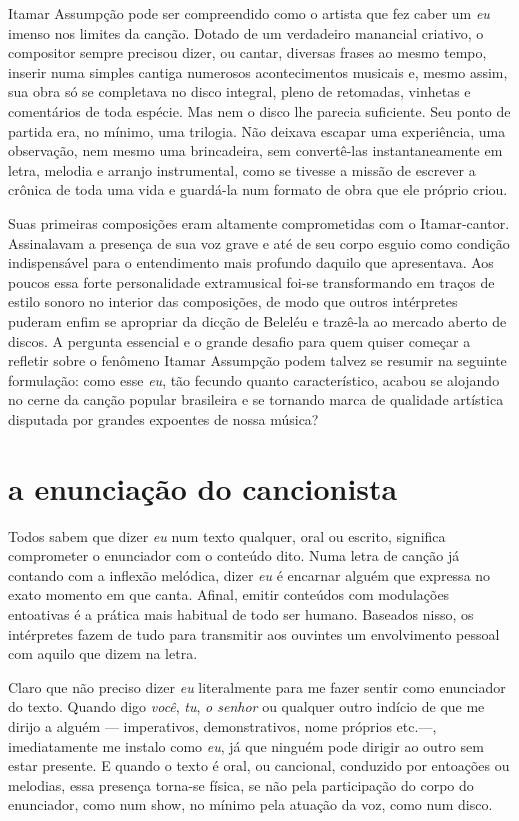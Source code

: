 Itamar Assumpção pode ser compreendido como o artista que fez caber um
\textit{eu} imenso nos limites da canção. Dotado de um verdadeiro manancial
criativo, o compositor sempre precisou dizer, ou cantar, diversas frases
ao mesmo tempo, inserir numa simples cantiga numerosos acontecimentos
musicais e, mesmo assim, sua obra só se completava no disco integral,
pleno de retomadas, vinhetas e comentários de toda espécie. Mas nem o
disco lhe parecia suficiente. Seu ponto de partida era, no mínimo, uma
trilogia. Não deixava escapar uma experiência, uma observação, nem mesmo
uma brincadeira, sem convertê-las instantaneamente em letra, melodia e
arranjo instrumental, como se tivesse a missão de escrever a crônica de
toda uma vida e guardá-la num formato de obra que ele próprio criou.

Suas primeiras composições eram altamente comprometidas com o
Itamar-cantor. Assinalavam a presença de sua voz grave e até de seu
corpo esguio como condição indispensável para o entendimento mais
profundo daquilo que apresentava. Aos poucos essa forte personalidade
extramusical foi-se transformando em traços de estilo sonoro no interior
das composições, de modo que outros intérpretes puderam enfim se
apropriar da dicção de Beleléu e trazê-la ao mercado aberto de discos. A
pergunta essencial e o grande desafio para quem quiser começar a
refletir sobre o fenômeno Itamar Assumpção podem talvez se resumir na
seguinte formulação: como esse \textit{eu}, tão fecundo quanto
característico, acabou se alojando no cerne da canção popular brasileira
e se tornando marca de qualidade artística disputada por grandes
expoentes de nossa música?

\section{a enunciação do cancionista}

Todos sabem que dizer \textit{eu} num texto qualquer, oral ou escrito,
significa comprometer o enunciador com o conteúdo dito. Numa letra de
canção já contando com a inflexão melódica, dizer \textit{eu} é encarnar
alguém que expressa no exato momento em que canta. Afinal, emitir
conteúdos com modulações entoativas é a prática mais habitual de todo
ser humano. Baseados nisso, os intérpretes fazem de tudo para transmitir
aos ouvintes um envolvimento pessoal com aquilo que dizem na letra.

Claro que não preciso dizer \textit{eu} literalmente para me fazer sentir
como enunciador do texto. Quando digo \textit{você}, \textit{tu}, \textit{o senhor} ou
qualquer outro indício de que me dirijo a alguém --- imperativos,
demonstrativos, nome próprios etc.---, imediatamente me instalo como
\textit{eu}, já que ninguém pode dirigir ao outro sem estar presente. E
quando o texto é oral, ou cancional, conduzido por entoações ou
melodias, essa presença torna-se física, se não pela participação do
corpo do enunciador, como num show, no mínimo pela atuação da voz, como
num disco.

